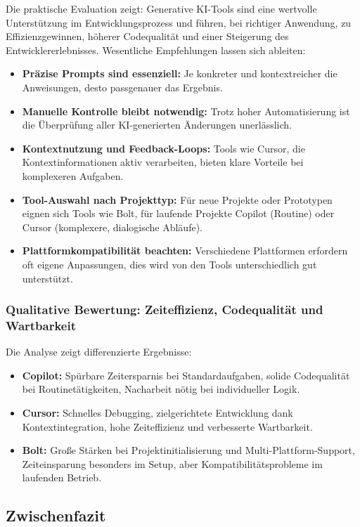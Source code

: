 Die praktische Evaluation zeigt: Generative KI-Tools sind eine wertvolle
Unterstützung im Entwicklungsprozess und führen, bei richtiger Anwendung, zu
Effizienzgewinnen, höherer Codequalität und einer Steigerung des
Entwicklererlebnisses. Wesentliche Empfehlungen lassen sich ableiten:

\begin{itemize}
      \item \textbf{Präzise Prompts sind essenziell:} Je konkreter und kontextreicher die Anweisungen, desto passgenauer das Ergebnis.
      \item \textbf{Manuelle Kontrolle bleibt notwendig:} Trotz hoher Automatisierung ist die Überprüfung aller KI-generierten Änderungen unerlässlich.
      \item \textbf{Kontextnutzung und Feedback-Loops:} Tools wie Cursor, die Kontextinformationen aktiv verarbeiten, bieten klare Vorteile bei komplexeren Aufgaben.
      \item \textbf{Tool-Auswahl nach Projekttyp:} Für neue Projekte oder Prototypen eignen sich Tools wie Bolt, für laufende Projekte Copilot (Routine) oder Cursor (komplexere, dialogische Abläufe).
      \item \textbf{Plattformkompatibilität beachten:} Verschiedene Plattformen erfordern oft eigene Anpassungen, dies wird von den Tools unterschiedlich gut unterstützt.
\end{itemize}

\subsubsection{Qualitative Bewertung: Zeiteffizienz, Codequalität und Wartbarkeit}

Die Analyse zeigt differenzierte Ergebnisse:
\begin{itemize}
      \item \textbf{Copilot:} Spürbare Zeitersparnis bei Standardaufgaben, solide Codequalität bei Routinetätigkeiten, Nacharbeit nötig bei individueller Logik.
      \item \textbf{Cursor:} Schnelles Debugging, zielgerichtete Entwicklung dank Kontextintegration, hohe Zeiteffizienz und verbesserte Wartbarkeit.
      \item \textbf{Bolt:} Große Stärken bei Projektinitialisierung und Multi-Plattform-Support, Zeiteinsparung besonders im Setup, aber Kompatibilitätsprobleme im laufenden Betrieb.
\end{itemize}

\subsection{Zwischenfazit}

